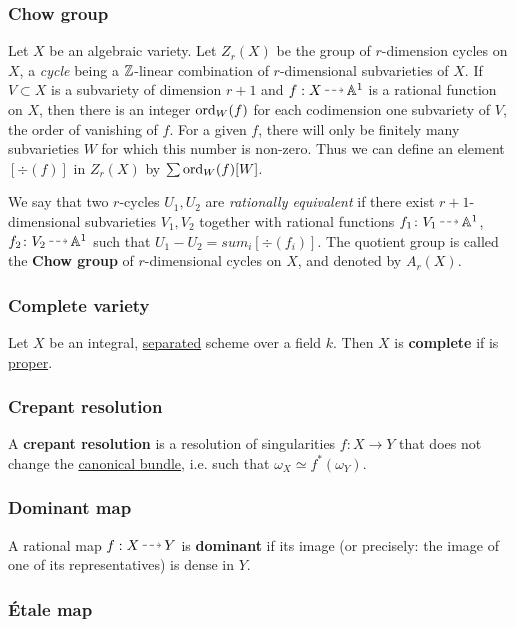 \documentclass[11pt, english]{article}
\begin{document}
\subsubsection{Chow group}
\label{chowgroup}
Let $X$ be an algebraic variety. Let $Z_r(X)$ be the group of $r$-dimension cycles on $X$, a \emph{cycle} being a $\mathbb{Z}$-linear combination of $r$-dimensional subvarieties of $X$. If $V \subset X$ is a subvariety of dimension $r+1$ and $f:X \rmap \Aa^1$ is a rational function on $X$, then there is an integer $\operatorname{ord}_W(f)$ for each codimension one subvariety of $V$, the order of vanishing of $f$. For a given $f$, there will only be finitely many subvarieties $W$ for which this number is non-zero. Thus we can define an element $[\div(f)]$ in $Z_r(X)$ by $\sum \operatorname{ord}_W(f) [W]$.

We say that two $r$-cycles $U_1,U_2$  are \emph{rationally equivalent} if there exist $r+1$-dimensional subvarieties $V_1,V_2$ together with rational functions $f_1\colon V_1 \rmap \Aa^1$, $f_2 \colon V_2 \rmap \Aa^1$ such that $U_1 - U_2 = sum_i [\div(f_i)]$. The quotient group is called the \textbf{Chow group} of $r$-dimensional cycles on $X$, and denoted by $A_r(X)$. 


\subsubsection{Complete variety}
\label{completevariety}
Let $X$ be an  integral, \hyperref[separated]{separated} scheme over a field $k$. Then $X$ is  \textbf{complete} if is \hyperref[proper]{proper}.

\subsubsection{Crepant resolution}
\label{crepantresolution}
A \textbf{crepant resolution} is a resolution of singularities $f:X \to Y$ that does not change the \hyperref[canonicalsheaf]{canonical bundle}, i.e. such that $\omega_X \simeq f^\ast (\omega_Y)$.

\subsubsection{Dominant map}
\label{dominantmap}

A rational map $f:X \rmap Y$ is  \textbf{dominant} if its image (or precisely: the image of one of its representatives) is dense in $Y$. 

\subsubsection{Étale map}
\label{etalemap}
\end{document}

